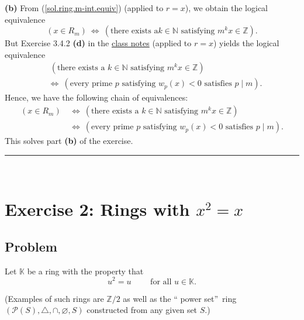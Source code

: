 \documentclass[paper=a4, fontsize=12pt]{scrartcl}%
\theoremstyle{plainsl}
\theoremstyle{definition}
\theoremstyle{remark}
\begin{document}
\textbf{(b)} From (\ref{sol.ring.m-int.equiv}) (applied to $r=x$), we obtain
the logical equivalence
\[
\left(  x\in R_{m}\right)  \ \Longleftrightarrow\ \left(  \text{there exists a
}k\in\mathbb{N}\text{ satisfying }m^{k}x\in\mathbb{Z}\right)  .
\]
But Exercise 3.4.2 \textbf{(d)} in the
\href{http://www.cip.ifi.lmu.de/~grinberg/t/19s/notes.pdf}{class notes}
(applied to $r=x$) yields the logical equivalence%
\begin{align*}
&  \ \left(  \text{there exists a }k\in\mathbb{N}\text{ satisfying }m^{k}%
x\in\mathbb{Z}\right) \\
&  \Longleftrightarrow\ \left(  \text{every prime }p\text{ satisfying }%
w_{p}\left(  x\right)  <0\text{ satisfies }p\mid m\right)  .
\end{align*}
Hence, we have the following chain of equivalences:%
\begin{align*}
\left(  x\in R_{m}\right)  \  &  \Longleftrightarrow\ \left(  \text{there
exists a }k\in\mathbb{N}\text{ satisfying }m^{k}x\in\mathbb{Z}\right) \\
&  \Longleftrightarrow\ \left(  \text{every prime }p\text{ satisfying }%
w_{p}\left(  x\right)  <0\text{ satisfies }p\mid m\right)  .
\end{align*}
This solves part \textbf{(b)} of the exercise.

\rule{\linewidth}{0.3pt} \\[0.4cm]

\section{Exercise 2: Rings with $x^{2} = x$}

\subsection{Problem}

Let $\mathbb{K}$ be a ring with the property that
\begin{equation}
u^{2}=u\qquad\text{ for all }u\in\mathbb{K}. \label{eq.exe.ring.xx=x.cond}%
\end{equation}


(Examples of such rings are $\mathbb{Z}/2$ as well as the \textquotedblleft
power set\textquotedblright\ ring $\left(  \mathcal{P}\left(  S\right)
,\triangle,\cap,\varnothing,S\right)  $ constructed from any given set $S$.)
\end{document}
